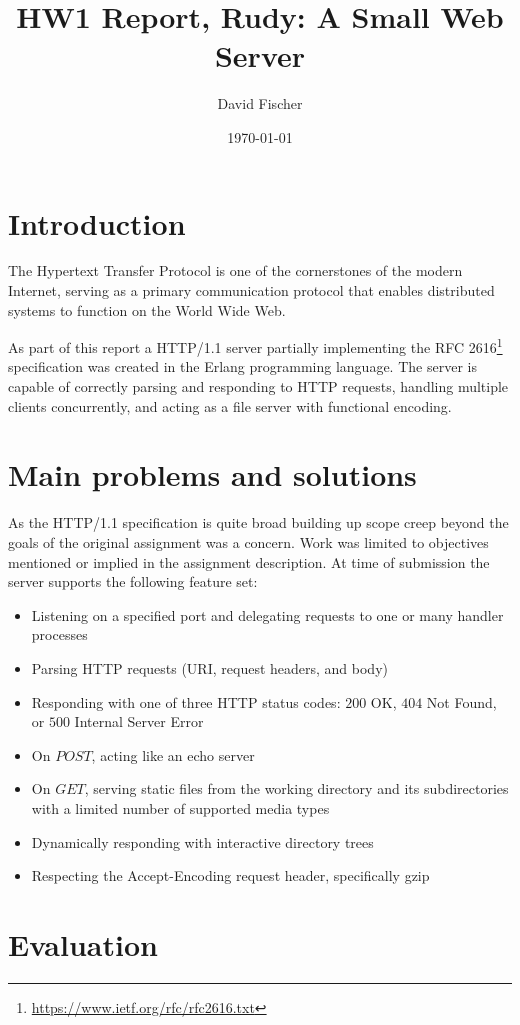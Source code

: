\documentclass[a4paper, 11pt]{article}
\title{HW1 Report, Rudy: A Small Web Server}
\author{David Fischer}
\date{\today{}}
\begin{document}
\maketitle

\section{Introduction}
The Hypertext Transfer Protocol is one of the cornerstones of the modern Internet, serving as a primary communication protocol that enables distributed systems to function on the World Wide Web.

As part of this report a HTTP/1.1 server partially implementing the RFC 2616\footnote{\url{https://www.ietf.org/rfc/rfc2616.txt}} specification was created in the Erlang programming language.
The server is capable of correctly parsing and responding to HTTP requests, handling multiple clients concurrently, and acting as a file server with functional encoding.
\section{Main problems and solutions}
As the HTTP/1.1 specification is quite broad building up scope creep beyond the goals of the original assignment was a concern. Work was limited to objectives mentioned or implied in the assignment description.
At time of submission the server supports the following feature set:
\begin{itemize}
\item Listening on a specified port and delegating requests to one or many handler processes 
\item Parsing HTTP requests (URI, request headers, and body)
\item Responding with one of three HTTP status codes: $200$ OK, $404$ Not Found, or $500$ Internal Server Error
\item On $POST$, acting like an echo server
\item On $GET$, serving static files from the working directory and its subdirectories with a limited number of supported media types
\item Dynamically responding with interactive directory trees
\item Respecting the Accept-Encoding request header, specifically gzip
\end{itemize}

\section{Evaluation}
\end{document}
